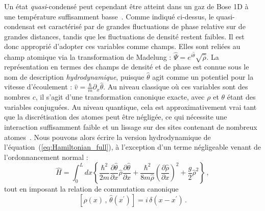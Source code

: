 \documentclass[aps,prd,notitlepage,amsfonts,amssymb,amsmath,nofootinbib,superscriptaddress,longbibliography]{revtex4-2}
\newcommand{\trad}[1]{\textcolor{tradcolor}{#1}}
\begin{document}
\trad{
Un état {\it quasi}-condensé peut cependant être atteint dans un gaz de Bose 1D à une température suffisamment basse~\cite{Petrov2004}. Comme indiqué ci-dessus, le quasi-condensat est caractérisé par de grandes fluctuations de phase relative sur de grandes distances, tandis que les fluctuations de densité restent faibles. Il est donc approprié d'adopter ces variables comme champs. Elles sont reliées au champ atomique via la transformation de Madelung : \(\hat{\Psi} = e^{i \hat{\theta}} \sqrt{\hat{\rho}}\). La représentation en termes des champs de densité et de phase est connue sous le nom de description {\it hydrodynamique}, puisque \(\hat{\theta}\) agit comme un potentiel pour la vitesse d'écoulement : \(\hat{v} = \frac{\hbar}{m} \partial_{x}\hat{\theta}\). Au niveau classique où ces variables sont des nombres \(c\), il s'agit d'une transformation canonique exacte, avec \(\rho\) et \(\theta\) étant des variables conjuguées. Au niveau quantique, cela est approximativement vrai tant que la discrétisation des atomes peut être négligée, ce qui nécessite une interaction suffisamment faible et un lissage sur des sites contenant de nombreux atomes~\cite{Mora_2003}. Nous pouvons alors écrire la version hydrodynamique de l'équation~(\ref{eq:Hamiltonian_full}), à l'exception d'un terme négligeable venant de l'ordonnancement normal :
\begin{equation*}
    \hat{H} = \int_{0}^{L} dx \left\{ \frac{\hbar^2}{2m} \frac{\partial \hat{\theta}}{\partial x} \hat{\rho} \frac{\partial \hat{\theta}}{\partial x} +  \frac{\hbar^2}{8m \hat{\rho}} \left( \frac{\partial \hat{\rho}}{\partial x} \right)^2  + \frac{g}{2} \hat{\rho}^2 \right\} \,,
\end{equation*}
tout en imposant la relation de commutation canonique
\begin{equation*}
    \left[ \hat{\rho}\left(x\right) \,,\, \hat{\theta}\left(x^{\prime}\right) \right] = i \, \delta\left(x-x^{\prime}\right) \,.
\end{equation*}
}
\end{document}
